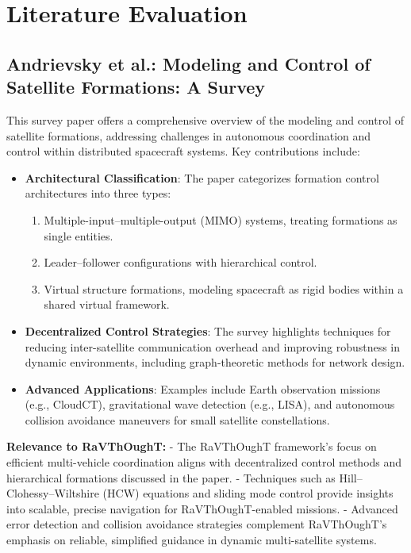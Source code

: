 % 

\section{Literature Evaluation}

\subsection{Andrievsky et al.: Modeling and Control of Satellite Formations: A Survey}

This survey paper offers a comprehensive overview of the modeling and control of satellite formations, addressing challenges in autonomous coordination and control within distributed spacecraft systems. Key contributions include:

\begin{itemize}
  \item \textbf{Architectural Classification}: The paper categorizes formation control architectures into three types:
  \begin{enumerate}
    \item Multiple-input–multiple-output (MIMO) systems, treating formations as single entities.
    \item Leader–follower configurations with hierarchical control.
    \item Virtual structure formations, modeling spacecraft as rigid bodies within a shared virtual framework.
  \end{enumerate}

  \item \textbf{Decentralized Control Strategies}: The survey highlights techniques for reducing inter-satellite communication overhead and improving robustness in dynamic environments, including graph-theoretic methods for network design.

  \item \textbf{Advanced Applications}: Examples include Earth observation missions (e.g., CloudCT), gravitational wave detection (e.g., LISA), and autonomous collision avoidance maneuvers for small satellite constellations.
\end{itemize}

\textbf{Relevance to RaVThOughT:}
- The RaVThOughT framework’s focus on efficient multi-vehicle coordination aligns with decentralized control methods and hierarchical formations discussed in the paper.
- Techniques such as Hill–Clohessy–Wiltshire (HCW) equations and sliding mode control provide insights into scalable, precise navigation for RaVThOughT-enabled missions.
- Advanced error detection and collision avoidance strategies complement RaVThOughT’s emphasis on reliable, simplified guidance in dynamic multi-satellite systems.

